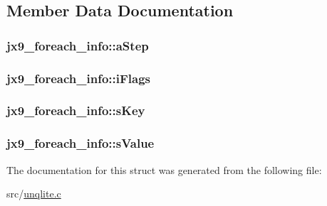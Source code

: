 \subsection{Member Data Documentation}
\hypertarget{structjx9__foreach__info_ae7f7dbcdea95f9fc00fe316ab3fb18fa}{
\subsubsection[{a\-Step}]{ jx9\-\_\-foreach\-\_\-info\-::a\-Step}}\label{d8/d1f/structjx9__foreach__info_ae7f7dbcdea95f9fc00fe316ab3fb18fa}
\hypertarget{structjx9__foreach__info_a7e07269c72e48c3ef53b9c91be64ea5b}{
\subsubsection[{i\-Flags}]{ jx9\-\_\-foreach\-\_\-info\-::i\-Flags}}\label{d8/d1f/structjx9__foreach__info_a7e07269c72e48c3ef53b9c91be64ea5b}
\hypertarget{structjx9__foreach__info_ac93605cf200e6d48588b479b95de48c1}{
\subsubsection[{s\-Key}]{ jx9\-\_\-foreach\-\_\-info\-::s\-Key}}\label{d8/d1f/structjx9__foreach__info_ac93605cf200e6d48588b479b95de48c1}
\hypertarget{structjx9__foreach__info_a0704efed4d29d020f06f769a8036585e}{
\subsubsection[{s\-Value}]{ jx9\-\_\-foreach\-\_\-info\-::s\-Value}}\label{d8/d1f/structjx9__foreach__info_a0704efed4d29d020f06f769a8036585e}


The documentation for this struct was generated from the following file\-:\begin{DoxyCompactItemize}
\item 
src/\hyperlink{unqlite_8c}{unqlite.\-c}\end{DoxyCompactItemize}
